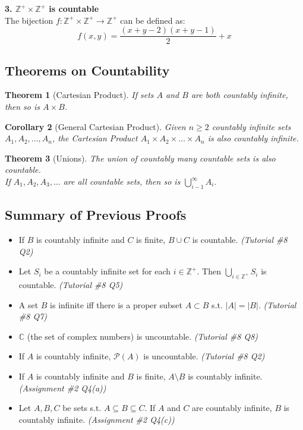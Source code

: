 \documentclass{article}
\theoremstyle{plain}
\newtheorem{theorem}{Theorem}[section]
\newtheorem{corollary}[theorem]{Corollary}
\theoremstyle{definition}
\theoremstyle{remark}
\begin{document}
\textbf{3. $\mathbb{Z}^+ \times \mathbb{Z}^+$ is countable} \\
The bijection $f: \mathbb{Z}^+ \times \mathbb{Z}^+ \rightarrow \mathbb{Z}^+$ can be defined as:
\[ f(x,y) = \frac{(x+y-2)(x+y-1)}{2} + x \]

\subsection{Theorems on Countability}

\begin{theorem}[Cartesian Product]
    If sets $A$ and $B$ are both countably infinite, then so is $A \times B$.
\end{theorem}

\begin{corollary}[General Cartesian Product]
    Given $n \geq 2$ countably infinite sets $A_1, A_2, \dots, A_n$, the Cartesian Product $A_1 \times A_2 \times \dots \times A_n$ is also countably infinite.
\end{corollary}

\begin{theorem}[Unions]
    The union of countably many countable sets is also countable. \\
    If $A_1, A_2, A_3, \dots$ are all countable sets, then so is $\bigcup_{i - 1}^{\infty} A_i$.
\end{theorem}

\subsection{Summary of Previous Proofs}
\begin{itemize}
    \item If $B$ is countably infinite and $C$ is finite, $B \cup C$ is countable. \textit{(Tutorial \#8 Q2)}
    \item Let $S_i$ be a countably infinite set for each $i \in \mathbb{Z}^+$. Then $\bigcup_{i \in \mathbb{Z}^+} S_i$ is countable. \textit{(Tutorial \#8 Q5)}
    \item A set $B$ is infinite iff there is a proper subset $A \subset B$ s.t. $|A| = |B|$. \textit{(Tutorial \#8 Q7)}
    \item $\mathbb{C}$ (the set of complex numbers) is uncountable. \textit{(Tutorial \#8 Q8)}
    \item If $A$ is countably infinite, $\mathcal{P}(A)$ is uncountable. \textit{(Tutorial \#8 Q2)}
    \item If $A$ is countably infinite and $B$ is finite, $A \setminus B$ is countably infinite. \textit{(Assignment \#2 Q4(a))}
    \item Let $A, B, C$ be sets s.t. $A \subseteq B \subseteq C$. If $A$ and $C$ are countably infinite, $B$ is countably infinite. \textit{(Assignment \#2 Q4(c))}
\end{itemize}
\end{document}
